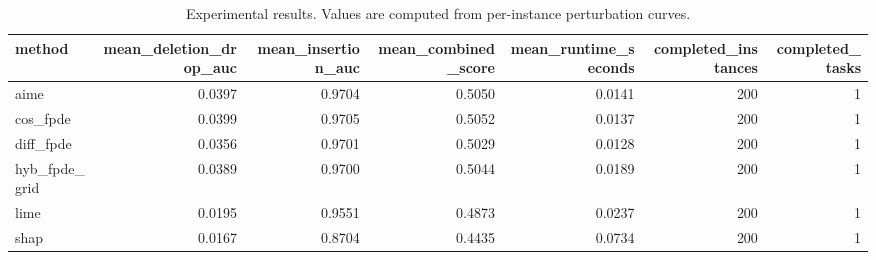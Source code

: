 \begin{table}[t]
\caption{Experimental results. Values are computed from per-instance perturbation curves.}
\label{tab:main_results_computed}
\centering
\begin{tabular}{lrrrrrr}
\toprule
method & mean\_deletion\_drop\_auc & mean\_insertion\_auc & mean\_combined\_score & mean\_runtime\_seconds & completed\_instances & completed\_tasks \\
\midrule
aime & 0.0397 & 0.9704 & 0.5050 & 0.0141 & 200 & 1 \\
cos\_fpde & 0.0399 & 0.9705 & 0.5052 & 0.0137 & 200 & 1 \\
diff\_fpde & 0.0356 & 0.9701 & 0.5029 & 0.0128 & 200 & 1 \\
hyb\_fpde\_grid & 0.0389 & 0.9700 & 0.5044 & 0.0189 & 200 & 1 \\
lime & 0.0195 & 0.9551 & 0.4873 & 0.0237 & 200 & 1 \\
shap & 0.0167 & 0.8704 & 0.4435 & 0.0734 & 200 & 1 \\
\bottomrule
\end{tabular}

\end{table}
